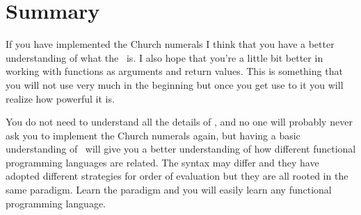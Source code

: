 \documentclass[a4paper,11pt]{article}
\begin{document}
\section{Summary}

If you have implemented the Church numerals I think that you have a
better understanding of what the \lamc\ is. I also hope that you're a
little bit better in working with functions as arguments and return
values. This is something that you will not use very much in the
beginning but once you get use to it you will realize how powerful it
is.

You do not need to understand all the details of \lamc , and no one
will probably never ask you to implement the Church numerals again,
but having a basic understanding of \lamc\ will give you a better
understanding of how different functional programming languages are
related. The syntax may differ and they have adopted different
strategies for order of evaluation but they are all rooted in the same
paradigm. Learn the paradigm and you will easily learn any functional
programming language.
\end{document}
